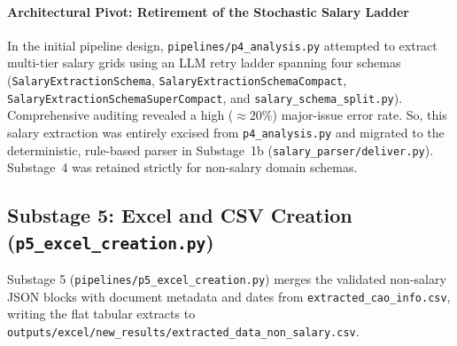 \paragraph{Architectural Pivot: Retirement of the Stochastic Salary Ladder}
In the initial pipeline design, \nolinkurl{pipelines/p4_analysis.py} attempted to extract multi-tier salary grids using an LLM retry ladder spanning four schemas (\texttt{Salary\-Extraction\-Schema}, \texttt{Salary\-Extraction\-Schema\-Compact}, \texttt{Salary\-Extraction\-Schema\-Super\-Compact}, and \texttt{salary\_schema\_split.py}). Comprehensive auditing revealed a high ($\approx 20\%$) major-issue error rate. So, this salary extraction was entirely excised from \texttt{p4\_analysis.py} and migrated to the deterministic, rule-based parser in Substage~1b (\nolinkurl{salary_parser/deliver.py}). Substage~4 was retained strictly for non-salary domain schemas.

\subsection{Substage 5: Excel and CSV Creation (\texttt{p5\_excel\_creation.py})}
\label{subsec:p5}

Substage 5 (\nolinkurl{pipelines/p5_excel_creation.py}) merges the validated non-salary JSON blocks with document metadata and dates from \nolinkurl{extracted_cao_info.csv}, writing the flat tabular extracts to \nolinkurl{outputs/excel/new_results/extracted_data_non_salary.csv}.


